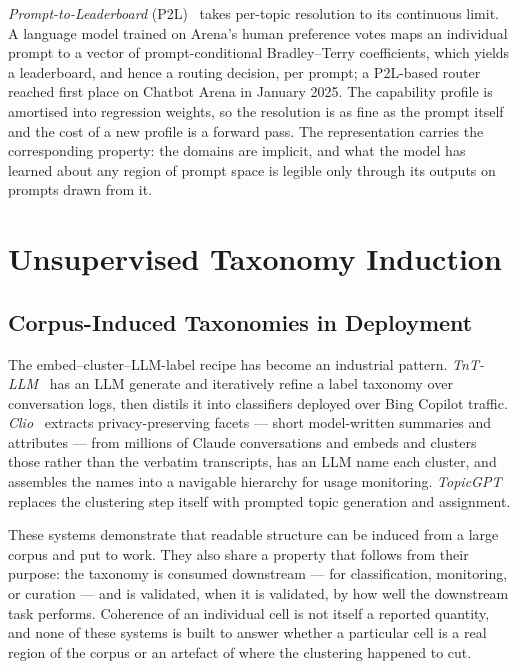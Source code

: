 \textit{Prompt-to-Leaderboard} (P2L)~\parencite{frick2025p2l} takes
per-topic resolution to its continuous limit. A language model
trained on Arena's human preference votes maps an individual prompt
to a vector of prompt-conditional Bradley--Terry coefficients, which
yields a leaderboard, and hence a routing decision, per prompt; a
P2L-based router reached first place on Chatbot Arena in January
2025. The capability profile is amortised into regression weights, so
the resolution is as fine as the prompt itself and the cost of a new
profile is a forward pass. The representation carries the
corresponding property: the domains are implicit, and what the model
has learned about any region of prompt space is legible only through
its outputs on prompts drawn from it.


\section{Unsupervised Taxonomy Induction}\label{sec:taxonomy-construction}

\subsection*{Corpus-Induced Taxonomies in Deployment}

The embed--cluster--LLM-label recipe has become an industrial
pattern. \textit{TnT-LLM}~\parencite{wan2024tntllm} has an LLM
generate and iteratively refine a label taxonomy over conversation
logs, then distils it into classifiers deployed over Bing Copilot
traffic. \textit{Clio}~\parencite{tamkin2024clio} extracts
privacy-preserving facets --- short model-written summaries and
attributes --- from millions of Claude conversations and embeds and
clusters those rather than the verbatim transcripts, has an LLM name
each cluster, and assembles the names into a navigable hierarchy for
usage monitoring.
\textit{TopicGPT}~\parencite{pham2024topicgpt} replaces the
clustering step itself with prompted topic generation and assignment.

These systems demonstrate that readable structure can be induced from
a large corpus and put to work. They also share a property that
follows from their purpose: the taxonomy is consumed downstream ---
for classification, monitoring, or curation --- and is validated, when
it is validated, by how well the downstream task performs.
Coherence of an individual cell is not itself a reported quantity,
and none of these systems is built to answer whether a particular
cell is a real region of the corpus or an artefact of where the
clustering happened to cut.

